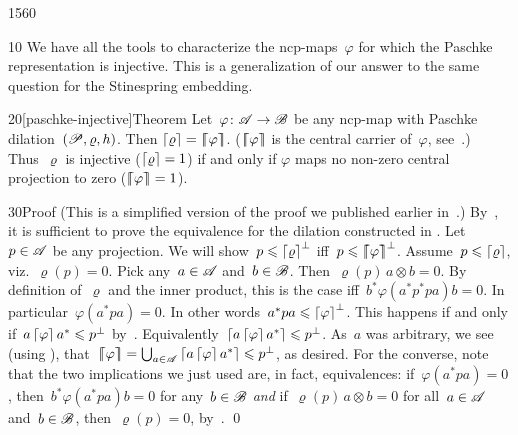 \begin{parsec}{1560}%
\begin{point}{10}%
We have all the tools to characterize
    the ncp-maps~$\varphi$
    for which the Paschke representation is injective.
This is a generalization of our answer\cite{stineinj}
    to the same question for the Stinespring embedding.
\end{point}
\begin{point}{20}[paschke-injective]{Theorem}%
Let~$\varphi\colon \mathscr{A} \to \mathscr{B}$ be any ncp-map
    with Paschke dilation~$(\mathscr{P}, \varrho, h)$.
Then $\left\lceil\varrho\right\rceil = \left\lceil\!\!\left\lceil\varphi\right\rceil\!\!\right\rceil$.
($\left\lceil\!\!\left\lceil\varphi\right\rceil\!\!\right\rceil$ is the central carrier of~$\varphi$, see~.)
Thus~$\varrho$ is injective ($\left\lceil\varrho\right\rceil=1$) if and only if $\varphi$
maps no non-zero central projection to zero ($\left\lceil\!\!\left\lceil\varphi\right\rceil\!\!\right\rceil=1$).
\begin{point}{30}{Proof}%
(This is a simplified version of the proof we published earlier
    in~\cite[Thm.~30]{paschke}.)
By~,
    it is sufficient to prove the equivalence
    for the dilation constructed in .
Let~$p \in \mathscr{A}$ be any projection.
We will show~$p \leqslant \left\lceil\varrho\right\rceil^\perp$ iff~$p \leqslant \left\lceil\!\!\left\lceil\varphi\right\rceil\!\!\right\rceil^\perp$.
Assume~$p \leqslant \left\lceil\varrho\right\rceil$,
    viz.~$\varrho(p) = 0$.
Pick any~$a \in \mathscr{A}$ and~$b\in \mathscr{B}$.
Then~$\varrho(p)\, a\otimes b = 0$.
By definition of~$\varrho$ and the inner product,
    this is the case iff~$b^* \varphi(a^*p^* pa) b = 0$.
In particular~$\varphi(a^* p a) = 0$.
In other words~$a^* p a \leqslant \left\lceil\varphi\right\rceil^\perp$.
This happens if and only if~$a \left\lceil\varphi\right\rceil a^* \leqslant p^\perp$
    by~.
Equivalently~$\left\lceil a \left\lceil\varphi\right\rceil a^*\right\rceil \leqslant p^\perp$.
As~$a$ was arbitrary,
    we see (using ),
    that~$\left\lceil\!\!\left\lceil\varphi\right\rceil\!\!\right\rceil = \bigcup_{a \in \mathscr{A}} \left\lceil a \left\lceil\varphi\right\rceil a^*\right\rceil
            \leqslant p^\perp$, as desired.
For the converse, note that
    the two implications we just used are, in fact, equivalences:
        if~$\varphi(a^* p a) =0$,
        then~$b^*\varphi(a^* pa) b = 0$ for any~$b \in \mathscr{B}$
        \emph{and} if~$\varrho(p)\, a \otimes b = 0$
        for all~$a \in \mathscr{A}$ and~$b\in \mathscr{B}$,
        then~$\varrho(p) = 0$, by~.
\qed
\end{point}
\end{point}
\end{parsec}

